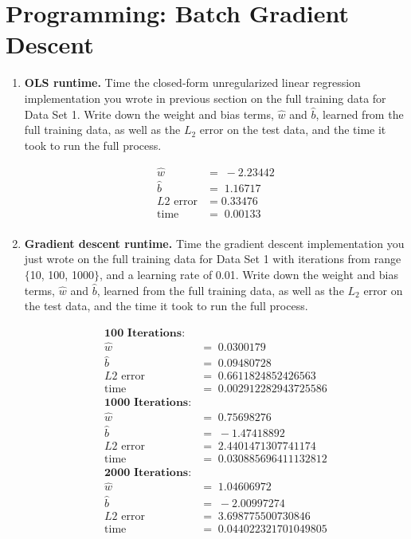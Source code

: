 \section{Programming: Batch Gradient Descent}

\begin{enumerate}
	\item \textbf{OLS runtime.} Time the closed-form unregularized linear regression  implementation you wrote in previous section on the full training data for Data Set 1. Write down the weight and bias terms, $\hat{w}$ and $\hat{b}$, learned from the full training data, as well as the $L_2$ error on the test data, and the time it took to run the full process.
	
	\begin{align*}
	\hat{w} &= \;      -2.23442 \\
	\hat{b} &= \;       1.16717 \\
	L2 \text{ error} &= 0.33476 \\
	\text{time} &=\;    0.00133 \\
	\end{align*}
	
	
	\item \textbf{Gradient descent runtime.} Time the gradient descent implementation you just wrote on the full training data for Data Set 1 with iterations from range $\{$10, 100, 1000$\}$, and a learning rate of 0.01. Write down the weight and bias terms, $\hat{w}$ and $\hat{b}$, learned from the full training data, as well as the $L_2$ error on the test data, and the time it took to run the full process. 
	
	
	\begin{align*}
	\textbf{100 Iterations:} \\
	\hat{w} &= \; 0.0300179 \\
	\hat{b} &= \; 0.09480728 \\
	L2 \text{ error} &= \; 0.6611824852426563 \\
	\text{time} &=\; 0.002912282943725586 \\
	\textbf{1000 Iterations:} \\
	\hat{w} &= \; 0.75698276 \\
	\hat{b} &= \; -1.47418892 \\
	L2 \text{ error} &= \; 2.4401471307741174 \\
	\text{time} &=\; 0.030885696411132812 \\
	\textbf{2000 Iterations:} \\
	\hat{w} &= \; 1.04606972 \\
	\hat{b} &= \; -2.00997274 \\
	L2 \text{ error} &= \; 3.698775500730846 \\
	\text{time} &=\; 0.044022321701049805 \\
	\end{align*}
	

\end{enumerate}
